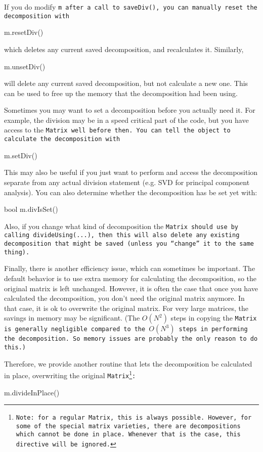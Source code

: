 If you do modify \tt{m} after a call to \tt{saveDiv()}, 
you can manually reset the decomposition with
\begin{tmvcode}
m.resetDiv()
\end{tmvcode}
which deletes any current saved decomposition, and recalculates it.
Similarly,
\begin{tmvcode}
m.unsetDiv()
\end{tmvcode}
will delete any current saved decomposition, but not calculate a new one.
This can be used to free up the memory that the decomposition had been using.

Sometimes you may want to set a decomposition before you actually need it.
For example, the division may be in a speed critical part of the code, but you have
access to the \tt{Matrix} well before then.  
You can tell the object to calculate the decomposition with
\begin{tmvcode}
m.setDiv()
\end{tmvcode}
This may also be useful if you just want to perform and access the decomposition
separate from any actual division statement (e.g. SVD for principal component analysis).
You can also determine whether the decomposition has be set yet with:
\begin{tmvcode}
bool m.divIsSet()
\end{tmvcode}

Also, if you change what kind of decomposition the \tt{Matrix} should use by calling
\tt{divideUsing(...)}, then this will also delete any existing decomposition that 
might be saved (unless you ``change'' it to the same thing).

Finally, there is another efficiency issue, which can sometimes be important.  The default
behavior is to use extra memory for calculating the decomposition, so the original
matrix is left unchanged.  However, it is often the case that once you have 
calculated the decomposition, you don't need the original matrix anymore.
In that case, it is ok to overwrite the original matrix.  For very large matrices, 
the savings in memory may be significant.  (The $O(N^2)$ steps in copying 
the \tt{Matrix} is generally negligible compared to the $O(N^3)$ steps in performing
the decomposition.  So memory issues are probably the only reason to do this.)

Therefore, we provide another routine that lets the decomposition be 
calculated in place, overwriting the original \tt{Matrix}\footnote{
Note: for a regular \tt{Matrix}, this is always possible.  However, for some of the 
special matrix varieties, there are decompositions which cannot be done in place.
Whenever that is the case, this directive will be ignored.}:
\begin{tmvcode}
m.divideInPlace()
\end{tmvcode}

